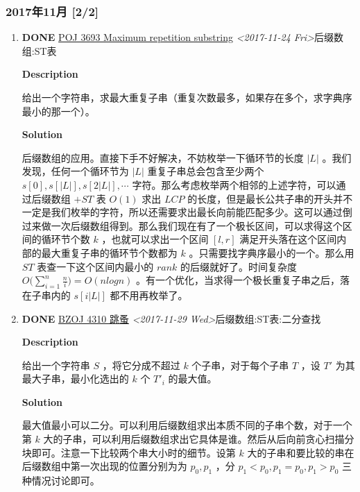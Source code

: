 \documentclass[11pt]{article}
\begin{document}
\subsubsection{2017年11月 [2/2]}
\label{sec-2-2-1}
\begin{enumerate}
\item {\bfseries\sffamily DONE} \href{https://vjudge.net/problem/POJ-3693}{POJ 3693 Maximum repetition substring} \textit{<2017-11-24 Fri>}\hfill{}\textsc{后缀数组:ST表}
\label{sec-2-2-1-1}

\textbf{Description}

给出一个字符串，求最大重复子串（重复次数最多，如果存在多个，求字典序最小的那一个）。

\textbf{Solution}

后缀数组的应用。直接下手不好解决，不妨枚举一下循环节的长度 $|L|$ 。我们发现，任何一个循环节为 $|L|$ 重复子串总会包含至少两个 $s[0],s[|L|],s[2|L|], \cdots$  字符。那么考虑枚举两个相邻的上述字符，可以通过后缀数组 $+ST$ 表 $O(1)$ 求出 $LCP$ 的长度，但是最长公共子串的开头并不一定是我们枚举的字符，所以还需要求出最长向前能匹配多少。这可以通过倒过来做一次后缀数组得到。那么我们现在有了一个极长区间，可以求得这个区间的循环节个数 $k$ ，也就可以求出一个区间 $[l,r]$ 满足开头落在这个区间内部的最大重复子串的循环节个数都为 $k$ 。只需要找字典序最小的一个。那么用 $ST$ 表查一下这个区间内最小的 $rank$ 的后缀就好了。时间复杂度 $O\Big(\sum_{i=1}^{n}\frac{n}{i}\Big)=O(nlogn)$ 。有一个优化，当求得一个极长重复子串之后，落在子串内的 $s[i|L|]$ 都不用再枚举了。

\item {\bfseries\sffamily DONE} \href{http://www.lydsy.com/JudgeOnline/problem.php?id=4310}{BZOJ 4310 跳蚤} \textit{<2017-11-29 Wed>}\hfill{}\textsc{后缀数组:ST表:二分查找}
\label{sec-2-2-1-2}

\textbf{Description}

给出一个字符串 $S$ ，将它分成不超过 $k$ 个子串，对于每个子串 $T$ ，设 $T'$ 为其最大子串，最小化选出的 $k$ 个 $T'_i$ 的最大值。

\textbf{Solution}

最大值最小可以二分。可以利用后缀数组求出本质不同的子串个数，对于一个第 $k$ 大的子串，可以利用后缀数组求出它具体是谁。然后从后向前贪心扫描分块即可。注意一下比较两个串大小时的细节。设第 $k$ 大的子串和要比较的串在后缀数组中第一次出现的位置分别为为 $p_0,p_1$ ，分 $p_1 < p_0,p_1=p_0,p_1 > p_0$ 三种情况讨论即可。
\end{enumerate}
\end{document}
